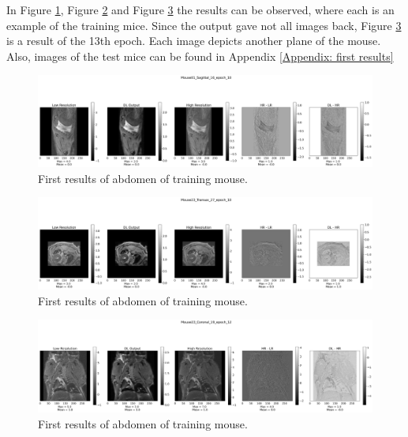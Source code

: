 \documentclass[twocolumn]{article}
\begin{document}
In Figure \ref{fig:first_sagittal}, Figure \ref{fig:first_transax} and Figure \ref{fig:first_coronal} the results can be observed, where each is an example of the training mice. 
Since the output gave not all images back, Figure \ref{fig:first_coronal} is a result of the 13th epoch.
Each image depicts another plane of the mouse. Also, images of the test mice can be found in Appendix \ref{Appendix: first results}

\begin{figure}
    \centering
    \includegraphics[width=1\linewidth]{Mouse01_Sagittal_16_epoch_10.png}
    \caption{First results of abdomen of training mouse.}
    \label{fig:first_sagittal}
\end{figure}

\begin{figure}
    \centering
    \includegraphics[width=1\linewidth]{Mouse23_Transax_27_epoch_10.png}
    \caption{First results of abdomen of training mouse.}
    \label{fig:first_transax}
\end{figure}

\begin{figure}
    \centering
    \includegraphics[width=1\linewidth]{Mouse23_Coronal_19_epoch_12.png}
    \caption{First results of abdomen of training mouse.}
    \label{fig:first_coronal}
\end{figure}
\end{document}
